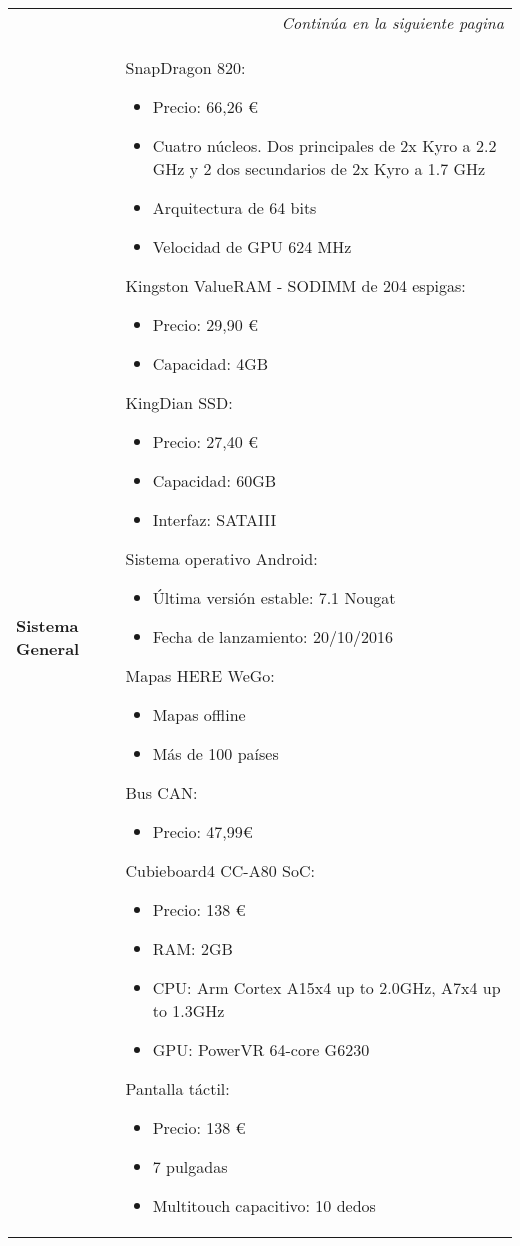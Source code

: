 \begin{center}
\begin{longtable}{p{5cm} p{8cm}}

\hline
\endfirsthead
\hline
\endhead

\hline \multicolumn{2}{r}{\textit{Continúa en la siguiente pagina}} \\
\endfoot
\hline
\endlastfoot

\textbf{Sistema General} &
SnapDragon 820:
\begin{itemize}
    \item Precio: 66,26 \euro
    \item Cuatro núcleos. Dos principales de 2x Kyro a 2.2 GHz y 2 dos secundarios de 2x Kyro a 1.7 GHz
    \item Arquitectura de 64 bits
    \item Velocidad de GPU 624 MHz
\end{itemize}
Kingston ValueRAM - SODIMM de 204 espigas:
\begin{itemize}
    \item Precio: 29,90 \euro
    \item Capacidad: 4GB
\end{itemize}
KingDian SSD:
\begin{itemize}
    \item Precio: 27,40 \euro
    \item Capacidad: 60GB
    \item Interfaz: SATAIII
\end{itemize}
Sistema operativo Android:
\begin{itemize}
    \item Última versión estable: 7.1 Nougat
    \item Fecha de lanzamiento: 20/10/2016
\end{itemize}
Mapas HERE WeGo:
\begin{itemize}
    \item Mapas offline
    \item Más de 100 países
\end{itemize}
Bus CAN:
\begin{itemize}
    \item Precio: 47,99\euro
\end{itemize}
Cubieboard4 CC-A80 SoC:
\begin{itemize}
    \item Precio: 138 \euro
    \item RAM: 2GB
    \item CPU:  Arm Cortex A15x4 up to 2.0GHz, A7x4 up to 1.3GHz
    \item GPU:  PowerVR 64-core G6230
\end{itemize}
Pantalla táctil:
\begin{itemize}
    \item Precio: 138 \euro
    \item 7 pulgadas
    \item Multitouch capacitivo: 10 dedos
\end{itemize}
\\ \hline


\end{longtable}
\end{center}
